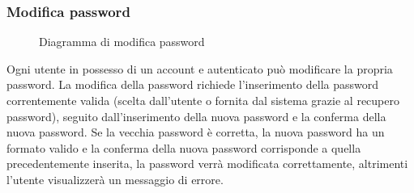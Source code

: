 \documentclass[a4paper, titlepage]{article}
\begin{document}
\subsubsection{Modifica password}
\begin{figure}[H]
	\centering
	\noindent{}
	\caption{Diagramma di modifica password}
\end{figure}
Ogni utente in possesso di un account e autenticato può modificare la propria password. La modifica della password richiede l’inserimento della password correntemente valida (scelta dall’utente o fornita dal sistema grazie al recupero password), seguito dall’inserimento della nuova password e la conferma della nuova password. Se la vecchia password è corretta, la nuova password ha un formato valido e la conferma della nuova password corrisponde a quella precedentemente inserita, la password verrà modificata correttamente, altrimenti l’utente visualizzerà un messaggio di errore.
\end{document}
